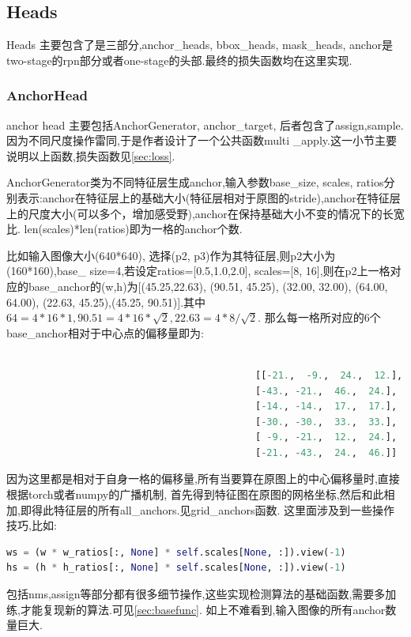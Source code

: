 \documentclass[UTF8]{ctexart}
\begin{document}
\subsection{Heads}
Heads 主要包含了是三部分,anchor\_heads, bbox\_heads, mask\_heads,
anchor是two-stage的rpn部分或者one-stage的头部.最终的损失函数均在这里实现.

\subsubsection{AnchorHead}
\label{sub:anchorhead}
anchor head 主要包括AnchorGenerator, anchor\_target, 后者包含了assign,sample.因为不同尺度操作雷同,于是作者设计了一个公共函数multi
\_apply.这一小节主要说明以上函数,损失函数见\ref{sec:loss}.

AnchorGenerator类为不同特征层生成anchor,输入参数base\_size, scales, ratios分别表示:anchor在特征层上的基础大小(特征层相对于原图的stride),anchor在特征层上的尺度大小(可以多个，增加感受野),anchor在保持基础大小不变的情况下的长宽比.
len(scales)*len(ratios)即为一格的anchor个数.

比如输入图像大小(640*640), 选择(p2, p3)作为其特征层,则p2大小为(160*160),base\_ size=4,若设定ratios=[0.5,1.0,2.0], scales=[8, 16],则在p2上一格对应的base\_anchor的(w,h)为[(45.25,22.63),  (90.51, 45.25),
 (32.00, 32.00),  (64.00, 64.00), (22.63, 45.25),(45.25, 90.51)].其中$64=4*16*1,90.51=4*16*\sqrt{2}, 22.63=4*8/\sqrt{2}.$
 那么每一格所对应的6个base\_anchor相对于中心点的偏移量即为:
\lstset{style=mystyle}
\begin{lstlisting}[language=Python]
	
											[[-21.,  -9.,  24.,  12.],
											[-43., -21.,  46.,  24.],
											[-14., -14.,  17.,  17.],
											[-30., -30.,  33.,  33.],
											[ -9., -21.,  12.,  24.],
											[-21., -43.,  24.,  46.]]

\end{lstlisting}

因为这里都是相对于自身一格的偏移量,所有当要算在原图上的中心偏移量时,直接根据torch或者numpy的广播机制,
首先得到特征图在原图的网格坐标,然后和此相加,即得此特征层的所有all\_anchors.见grid\_anchors函数.
这里面涉及到一些操作技巧,比如:
\lstset{style=mystyle}
\begin{lstlisting}[language=Python]
ws = (w * w_ratios[:, None] * self.scales[None, :]).view(-1)
hs = (h * h_ratios[:, None] * self.scales[None, :]).view(-1)
\end{lstlisting}
包括nms,assign等部分都有很多细节操作,这些实现检测算法的基础函数,需要多加练,才能复现新的算法.可见\ref{sec:basefunc}.
如上不难看到,输入图像的所有anchor数量巨大.
\end{document}
